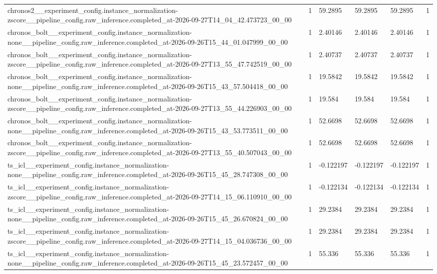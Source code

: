 \begin{tabular}{llllll}
chronos2\_\_experiment\_config.instance\_normalization-zscore\_\_pipeline\_config.raw\_inference.completed\_at-2026-09-27T14\_04\_42.473723\_00\_00 & 1 & 59.2895 & 59.2895 & 59.2895 & 1 \\
chronos\_bolt\_\_experiment\_config.instance\_normalization-none\_\_pipeline\_config.raw\_inference.completed\_at-2026-09-26T15\_44\_01.047999\_00\_00 & 1 & 2.40146 & 2.40146 & 2.40146 & 1 \\
chronos\_bolt\_\_experiment\_config.instance\_normalization-zscore\_\_pipeline\_config.raw\_inference.completed\_at-2026-09-27T13\_55\_47.742519\_00\_00 & 1 & 2.40737 & 2.40737 & 2.40737 & 1 \\
chronos\_bolt\_\_experiment\_config.instance\_normalization-none\_\_pipeline\_config.raw\_inference.completed\_at-2026-09-26T15\_43\_57.504418\_00\_00 & 1 & 19.5842 & 19.5842 & 19.5842 & 1 \\
chronos\_bolt\_\_experiment\_config.instance\_normalization-zscore\_\_pipeline\_config.raw\_inference.completed\_at-2026-09-27T13\_55\_44.226903\_00\_00 & 1 & 19.584 & 19.584 & 19.584 & 1 \\
chronos\_bolt\_\_experiment\_config.instance\_normalization-none\_\_pipeline\_config.raw\_inference.completed\_at-2026-09-26T15\_43\_53.773511\_00\_00 & 1 & 52.6698 & 52.6698 & 52.6698 & 1 \\
chronos\_bolt\_\_experiment\_config.instance\_normalization-zscore\_\_pipeline\_config.raw\_inference.completed\_at-2026-09-27T13\_55\_40.507043\_00\_00 & 1 & 52.6698 & 52.6698 & 52.6698 & 1 \\
ts\_icl\_\_experiment\_config.instance\_normalization-none\_\_pipeline\_config.raw\_inference.completed\_at-2026-09-26T15\_45\_28.747308\_00\_00 & 1 & -0.122197 & -0.122197 & -0.122197 & 1 \\
ts\_icl\_\_experiment\_config.instance\_normalization-zscore\_\_pipeline\_config.raw\_inference.completed\_at-2026-09-27T14\_15\_06.110910\_00\_00 & 1 & -0.122134 & -0.122134 & -0.122134 & 1 \\
ts\_icl\_\_experiment\_config.instance\_normalization-none\_\_pipeline\_config.raw\_inference.completed\_at-2026-09-26T15\_45\_26.670824\_00\_00 & 1 & 29.2384 & 29.2384 & 29.2384 & 1 \\
ts\_icl\_\_experiment\_config.instance\_normalization-zscore\_\_pipeline\_config.raw\_inference.completed\_at-2026-09-27T14\_15\_04.036736\_00\_00 & 1 & 29.2384 & 29.2384 & 29.2384 & 1 \\
ts\_icl\_\_experiment\_config.instance\_normalization-none\_\_pipeline\_config.raw\_inference.completed\_at-2026-09-26T15\_45\_23.572457\_00\_00 & 1 & 55.336 & 55.336 & 55.336 & 1 \\

\end{tabular}
